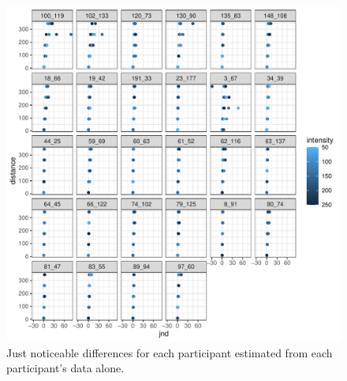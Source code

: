 \begin{knitrout}
\color{fgcolor}\begin{figure}
\includegraphics[width=\maxwidth]{figure/jnd_lu-1} \caption[Just noticeable differences for each participant estimated from each participant's data alone]{Just noticeable differences for each participant estimated from each participant's data alone.}\label{fig:jnd_lu}
\end{figure}

\end{knitrout}






